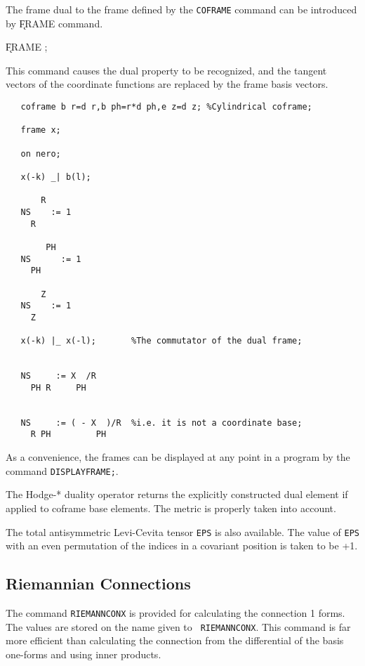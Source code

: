 The frame dual to the frame defined by the {\tt COFRAME} command can
be introduced by \k{FRAME} command. 

\hspace*{2em} \k{FRAME} ;\label{FRAME}

This command causes the
dual property to be recognized, and the tangent vectors of the
coordinate functions are replaced by the frame basis vectors.

\example{}

\begin{verbatim}
   coframe b r=d r,b ph=r*d ph,e z=d z; %Cylindrical coframe;

   frame x;

   on nero;

   x(-k) _| b(l);

       R
   NS    := 1
     R

        PH
   NS      := 1
     PH

       Z
   NS    := 1
     Z

   x(-k) |_ x(-l);       %The commutator of the dual frame;


   NS     := X  /R
     PH R     PH


   NS     := ( - X  )/R  %i.e. it is not a coordinate base;
     R PH         PH

\end{verbatim}

 
As a convenience, the frames can be displayed at any point in a program
by the command {\tt DISPLAYFRAME;}\label{DISPLAYFRAME}.

The Hodge-* duality operator returns the explicitly constructed dual
element if applied to coframe base elements. The metric is properly
taken into account.

 
The total antisymmetric Levi-Cevita tensor {\tt EPS}\label{EPS} is
also available.  The value of {\tt EPS} with an even permutation of the
indices in a covariant position is taken to be +1.


\subsection{Riemannian Connections}

The command {\tt RIEMANNCONX} is provided for calculating the
 \label{RIEMANNCONX}
connection 1 forms.  The values are stored on the name given to {\tt
RIEMANNCONX}.  This command is far more efficient than calculating the
connection from the differential of the basis one-forms and using
inner products.

